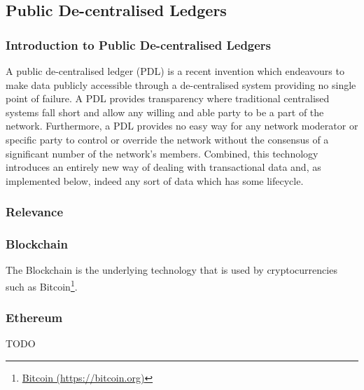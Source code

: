 \subsection{Public De-centralised Ledgers}

\subsubsection{Introduction to Public De-centralised Ledgers}

A public de-centralised ledger (PDL) is a recent invention which endeavours to make data publicly accessible through a de-centralised system providing no single point of failure. A PDL provides transparency where traditional centralised systems fall short and allow any willing and able party to be a part of the network. Furthermore, a PDL provides no easy way for any network moderator or specific party to control or override the network without the consensus of a significant number of the network's members. Combined, this technology introduces an entirely new way of dealing with transactional data and, as implemented below, indeed any sort of data which has some lifecycle.

\subsubsection{Relevance}





\subsubsection{Blockchain}

The Blockchain is the underlying technology that is used by cryptocurrencies such as Bitcoin\footnote{\href{https://bitcoin.org/en/}{Bitcoin (https://bitcoin.org)}}.

\subsubsection{Ethereum}

TODO
